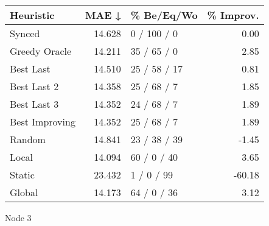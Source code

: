 \begin{tabular}{lrlr}
\toprule
\textbf{Heuristic} & \textbf{MAE ↓} & \textbf{\% Be/Eq/Wo} & \textbf{\% Improv.} \\
\midrule
            Synced &         14.628 &          0 / 100 / 0 &                0.00 \\
     Greedy Oracle &         14.211 &          35 / 65 / 0 &                2.85 \\
         Best Last &         14.510 &         25 / 58 / 17 &                0.81 \\
       Best Last 2 &         14.358 &          25 / 68 / 7 &                1.85 \\
       Best Last 3 &         14.352 &          24 / 68 / 7 &                1.89 \\
    Best Improving &         14.352 &          25 / 68 / 7 &                1.89 \\
            Random &         14.841 &         23 / 38 / 39 &               -1.45 \\
             Local &         14.094 &          60 / 0 / 40 &                3.65 \\
            Static &         23.432 &           1 / 0 / 99 &              -60.18 \\
            Global &         14.173 &          64 / 0 / 36 &                3.12 \\
\bottomrule
\end{tabular}
\caption{Node 3}
\label{tab:iid_lr05_le1_bs4_3}
